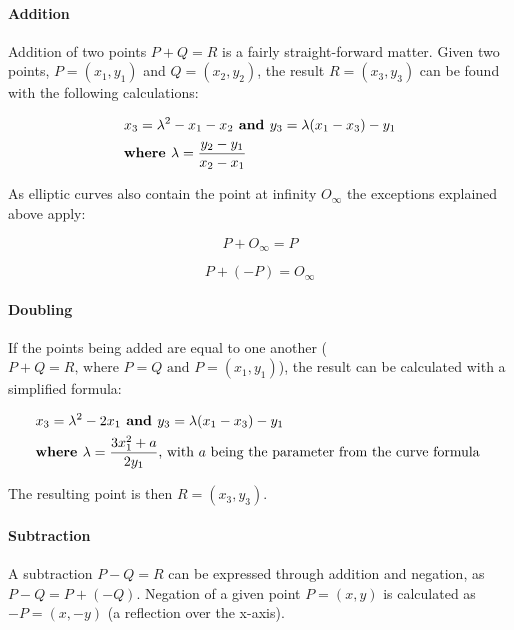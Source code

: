 \paragraph{Addition}

Addition of two points \(P + Q = R\) is a fairly straight-forward matter. Given two points, \(P = (x_1,y_1)\) and
\(Q = (x_2,y_2)\), the result \(R = (x_3,y_3)\) can be found with the following calculations:

\begin{align}
	& x_3 = \lambda^2 - x_1 - x_2 \textbf{ and } y_3 = \lambda (x_1 - x_3) - y_1\\
    & \textbf{where } \lambda = {{y_2-y_1} \over {x_2-x_1}}
\end{align}

As elliptic curves also contain the point at infinity \(O_\infty\) the exceptions explained above apply:

\begin{equation}
	P + O_\infty = P
\end{equation}

\begin{equation}
	P + (-P) = O_\infty
\end{equation}

\paragraph{Doubling}

If the points being added are equal to one another (\(P + Q = R \text{, where } P = Q \text{ and } P = (x_1,y_1)\)),
the result can be calculated with a simplified formula:

\begin{align}
	& x_3 = \lambda^2 - 2x_1 \textbf{ and } y_3 = \lambda (x_1 - x_3) - y_1 \\
    & \textbf{where } \lambda = {{3x_1^2 + a} \over {2y_1}} \text{, with } a \text { being the parameter from the curve formula }
\end{align}

The resulting point is then \(R = (x_3, y_3)\).

\paragraph{Subtraction}

A subtraction \(P - Q = R\) can be expressed through addition and negation, as \(P - Q = P + (-Q)\). Negation of a given point
\(P = (x,y)\) is calculated as \(-P = (x,-y)\) (a reflection over the x-axis).

